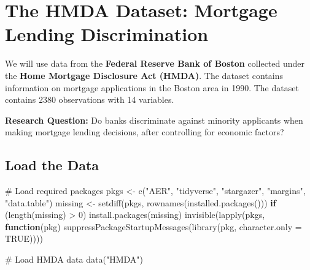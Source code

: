 \documentclass[
  12pt,
  a4paper,
]{scrbook}
\newenvironment{Shaded}{\begin{snugshade}}{\end{snugshade}}
\newcommand{\AttributeTok}[1]{\textcolor[rgb]{0.40,0.45,0.13}{#1}}
\newcommand{\CommentTok}[1]{\textcolor[rgb]{0.37,0.37,0.37}{#1}}
\newcommand{\ConstantTok}[1]{\textcolor[rgb]{0.56,0.35,0.01}{#1}}
\newcommand{\ControlFlowTok}[1]{\textcolor[rgb]{0.00,0.23,0.31}{\textbf{#1}}}
\newcommand{\DecValTok}[1]{\textcolor[rgb]{0.68,0.00,0.00}{#1}}
\newcommand{\FunctionTok}[1]{\textcolor[rgb]{0.28,0.35,0.67}{#1}}
\newcommand{\NormalTok}[1]{\textcolor[rgb]{0.00,0.23,0.31}{#1}}
\newcommand{\OtherTok}[1]{\textcolor[rgb]{0.00,0.23,0.31}{#1}}
\newcommand{\SpecialCharTok}[1]{\textcolor[rgb]{0.37,0.37,0.37}{#1}}
\newcommand{\StringTok}[1]{\textcolor[rgb]{0.13,0.47,0.30}{#1}}
\theoremstyle{plain}
\theoremstyle{definition}
\theoremstyle{remark}
\begin{document}
\section{The HMDA Dataset: Mortgage Lending
Discrimination}\label{the-hmda-dataset-mortgage-lending-discrimination}

We will use data from the \textbf{Federal Reserve Bank of Boston}
collected under the \textbf{Home Mortgage Disclosure Act (HMDA)}. The
dataset contains information on mortgage applications in the Boston area
in 1990. The dataset contains 2380 observations with 14 variables.

\textbf{Research Question:} Do banks discriminate against minority
applicants when making mortgage lending decisions, after controlling for
economic factors?

\subsection{Load the Data}\label{load-the-data}

\begin{Shaded}
\begin{Highlighting}[]
\CommentTok{\# Load required packages}
\NormalTok{pkgs }\OtherTok{\textless{}{-}} \FunctionTok{c}\NormalTok{(}\StringTok{"AER"}\NormalTok{, }\StringTok{"tidyverse"}\NormalTok{, }\StringTok{"stargazer"}\NormalTok{, }\StringTok{"margins"}\NormalTok{, }\StringTok{"data.table"}\NormalTok{)}
\NormalTok{missing }\OtherTok{\textless{}{-}} \FunctionTok{setdiff}\NormalTok{(pkgs, }\FunctionTok{rownames}\NormalTok{(}\FunctionTok{installed.packages}\NormalTok{()))}
\ControlFlowTok{if}\NormalTok{ (}\FunctionTok{length}\NormalTok{(missing) }\SpecialCharTok{\textgreater{}} \DecValTok{0}\NormalTok{) }\FunctionTok{install.packages}\NormalTok{(missing)}
\FunctionTok{invisible}\NormalTok{(}\FunctionTok{lapply}\NormalTok{(pkgs, }\ControlFlowTok{function}\NormalTok{(pkg) }\FunctionTok{suppressPackageStartupMessages}\NormalTok{(}\FunctionTok{library}\NormalTok{(pkg, }\AttributeTok{character.only =} \ConstantTok{TRUE}\NormalTok{))))}

\CommentTok{\# Load HMDA data}
\FunctionTok{data}\NormalTok{(}\StringTok{"HMDA"}\NormalTok{)}
\end{Highlighting}
\end{Shaded}
\end{document}
